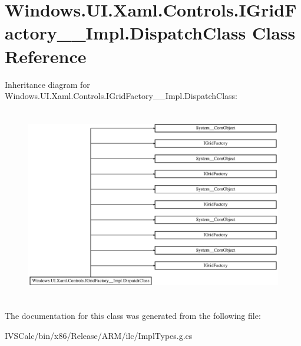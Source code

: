 \hypertarget{class_windows_1_1_u_i_1_1_xaml_1_1_controls_1_1_i_grid_factory_____impl_1_1_dispatch_class}{}\section{Windows.\+U\+I.\+Xaml.\+Controls.\+I\+Grid\+Factory\+\_\+\+\_\+\+Impl.\+Dispatch\+Class Class Reference}
\label{class_windows_1_1_u_i_1_1_xaml_1_1_controls_1_1_i_grid_factory_____impl_1_1_dispatch_class}
Inheritance diagram for Windows.\+U\+I.\+Xaml.\+Controls.\+I\+Grid\+Factory\+\_\+\+\_\+\+Impl.\+Dispatch\+Class\+:\begin{figure}[H]
\begin{center}
\leavevmode
\includegraphics[height=8.484849cm]{class_windows_1_1_u_i_1_1_xaml_1_1_controls_1_1_i_grid_factory_____impl_1_1_dispatch_class}
\end{center}
\end{figure}


The documentation for this class was generated from the following file\+:\begin{DoxyCompactItemize}
\item 
I\+V\+S\+Calc/bin/x86/\+Release/\+A\+R\+M/ilc/Impl\+Types.\+g.\+cs\end{DoxyCompactItemize}
